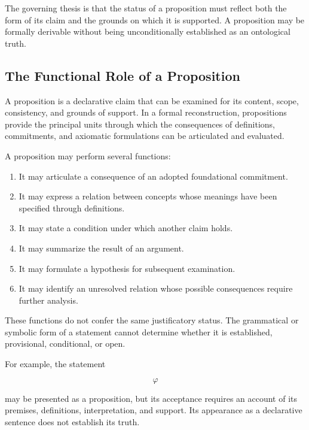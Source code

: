 The governing thesis is that the status of a proposition must
reflect both the form of its claim and the grounds on which it
is supported. A proposition may be formally derivable without
being unconditionally established as an ontological truth.

\subsection{The Functional Role of a Proposition}

A proposition is a declarative claim that can be examined for
its content, scope, consistency, and grounds of support. In a
formal reconstruction, propositions provide the principal
units through which the consequences of definitions, commitments,
and axiomatic formulations can be articulated and evaluated.

A proposition may perform several functions:

\begin{enumerate}
    \item It may articulate a consequence of an adopted
    foundational commitment.

    \item It may express a relation between concepts whose
    meanings have been specified through definitions.

    \item It may state a condition under which another claim
    holds.

    \item It may summarize the result of an argument.

    \item It may formulate a hypothesis for subsequent
    examination.

    \item It may identify an unresolved relation whose
    possible consequences require further analysis.
\end{enumerate}

These functions do not confer the same justificatory status.
The grammatical or symbolic form of a statement cannot determine
whether it is established, provisional, conditional, or open.

For example, the statement

\[
    \varphi
\]

may be presented as a proposition, but its acceptance requires
an account of its premises, definitions, interpretation, and
support. Its appearance as a declarative sentence does not
establish its truth.

